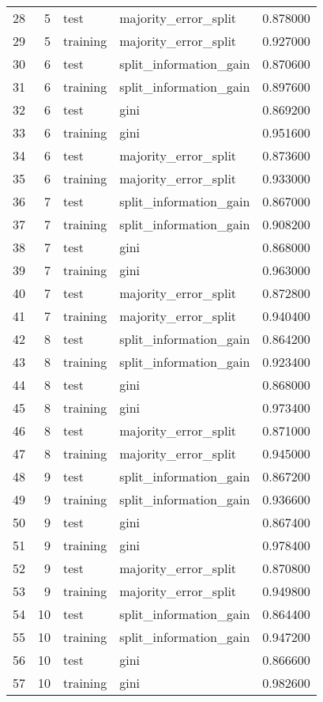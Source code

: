 \begin{tabular}{lrllr}
28 & 5 & test & majority_error_split & 0.878000 \\
29 & 5 & training & majority_error_split & 0.927000 \\
30 & 6 & test & split_information_gain & 0.870600 \\
31 & 6 & training & split_information_gain & 0.897600 \\
32 & 6 & test & gini & 0.869200 \\
33 & 6 & training & gini & 0.951600 \\
34 & 6 & test & majority_error_split & 0.873600 \\
35 & 6 & training & majority_error_split & 0.933000 \\
36 & 7 & test & split_information_gain & 0.867000 \\
37 & 7 & training & split_information_gain & 0.908200 \\
38 & 7 & test & gini & 0.868000 \\
39 & 7 & training & gini & 0.963000 \\
40 & 7 & test & majority_error_split & 0.872800 \\
41 & 7 & training & majority_error_split & 0.940400 \\
42 & 8 & test & split_information_gain & 0.864200 \\
43 & 8 & training & split_information_gain & 0.923400 \\
44 & 8 & test & gini & 0.868000 \\
45 & 8 & training & gini & 0.973400 \\
46 & 8 & test & majority_error_split & 0.871000 \\
47 & 8 & training & majority_error_split & 0.945000 \\
48 & 9 & test & split_information_gain & 0.867200 \\
49 & 9 & training & split_information_gain & 0.936600 \\
50 & 9 & test & gini & 0.867400 \\
51 & 9 & training & gini & 0.978400 \\
52 & 9 & test & majority_error_split & 0.870800 \\
53 & 9 & training & majority_error_split & 0.949800 \\
54 & 10 & test & split_information_gain & 0.864400 \\
55 & 10 & training & split_information_gain & 0.947200 \\
56 & 10 & test & gini & 0.866600 \\
57 & 10 & training & gini & 0.982600 \\

\end{tabular}

